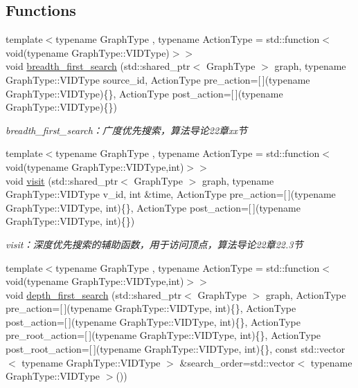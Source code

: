 \subsection*{Functions}
\begin{DoxyCompactItemize}
\item 
{\footnotesize template$<$typename Graph\+Type , typename Action\+Type  = std\+::function$<$ void(typename Graph\+Type\+::\+V\+I\+D\+Type)$>$$>$ }\\void \hyperlink{namespace_introduction_to_algorithm_1_1_graph_algorithm_a9c57b397479972f84b4b10bc19968297}{breadth\+\_\+first\+\_\+search} (std\+::shared\+\_\+ptr$<$ Graph\+Type $>$ graph, typename Graph\+Type\+::\+V\+I\+D\+Type source\+\_\+id, Action\+Type pre\+\_\+action=\mbox{[}$\,$\mbox{]}(typename Graph\+Type\+::\+V\+I\+D\+Type)\{\}, Action\+Type post\+\_\+action=\mbox{[}$\,$\mbox{]}(typename Graph\+Type\+::\+V\+I\+D\+Type)\{\})
\begin{DoxyCompactList}\small\item\em breadth\+\_\+first\+\_\+search：广度优先搜索，算法导论22章xx节 \end{DoxyCompactList}\item 
{\footnotesize template$<$typename Graph\+Type , typename Action\+Type  = std\+::function$<$void(typename Graph\+Type\+::\+V\+I\+D\+Type,int)$>$$>$ }\\void \hyperlink{namespace_introduction_to_algorithm_1_1_graph_algorithm_af651a2b435fc270ab711e573d83a385d}{visit} (std\+::shared\+\_\+ptr$<$ Graph\+Type $>$ graph, typename Graph\+Type\+::\+V\+I\+D\+Type v\+\_\+id, int \&time, Action\+Type pre\+\_\+action=\mbox{[}$\,$\mbox{]}(typename Graph\+Type\+::\+V\+I\+D\+Type, int)\{\}, Action\+Type post\+\_\+action=\mbox{[}$\,$\mbox{]}(typename Graph\+Type\+::\+V\+I\+D\+Type, int)\{\})
\begin{DoxyCompactList}\small\item\em visit：深度优先搜索的辅助函数，用于访问顶点，算法导论22章22.3节 \end{DoxyCompactList}\item 
{\footnotesize template$<$typename Graph\+Type , typename Action\+Type  = std\+::function$<$void(typename Graph\+Type\+::\+V\+I\+D\+Type,int)$>$$>$ }\\void \hyperlink{namespace_introduction_to_algorithm_1_1_graph_algorithm_a3bb9faf89f84f73b716c25966786e078}{depth\+\_\+first\+\_\+search} (std\+::shared\+\_\+ptr$<$ Graph\+Type $>$ graph, Action\+Type pre\+\_\+action=\mbox{[}$\,$\mbox{]}(typename Graph\+Type\+::\+V\+I\+D\+Type, int)\{\}, Action\+Type post\+\_\+action=\mbox{[}$\,$\mbox{]}(typename Graph\+Type\+::\+V\+I\+D\+Type, int)\{\}, Action\+Type pre\+\_\+root\+\_\+action=\mbox{[}$\,$\mbox{]}(typename Graph\+Type\+::\+V\+I\+D\+Type, int)\{\}, Action\+Type post\+\_\+root\+\_\+action=\mbox{[}$\,$\mbox{]}(typename Graph\+Type\+::\+V\+I\+D\+Type, int)\{\}, const std\+::vector$<$ typename Graph\+Type\+::\+V\+I\+D\+Type $>$ \&search\+\_\+order=std\+::vector$<$ typename Graph\+Type\+::\+V\+I\+D\+Type $>$())

\end{DoxyCompactItemize}
